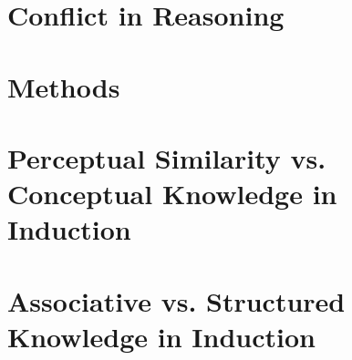 \documentclass{Dissertate}
\begin{document}
\linespread{1.4}



\maketitle
\copyrightpage
\abstractpage

\tableofcontents
{}
{}

\listoffigures
{}
{}
\newpage

\listoftables
{}
{}
\newpage

\acknowledgments

\newpage
\setcounter{page}{1}

\chapter{Conflict in Reasoning}
\graphicspath{{1.Conflict/}}






\chapter{Methods}
\graphicspath{{2.Methods/}}



\chapter{Perceptual Similarity vs. Conceptual Knowledge in Induction}
\graphicspath{{3.Similarity/}}









\chapter{Associative vs. Structured Knowledge in Induction}
\graphicspath{{4.Associations/}}








\end{document}
